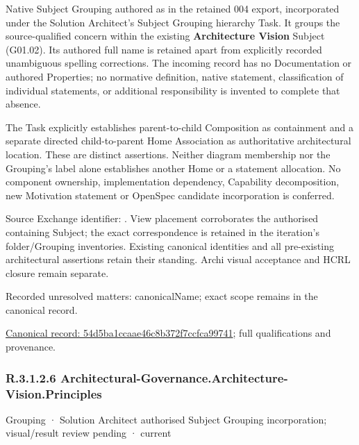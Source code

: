 Native Subject Grouping authored as \texttt{} in the retained 004 export,
incorporated under the Solution Architect's Subject Grouping hierarchy Task.
It groups the source-qualified \texttt{} concern within
the existing \textbf{Architecture Vision} Subject (G01.02). Its authored full name
is retained apart from explicitly recorded unambiguous spelling corrections.
The incoming record has no Documentation or authored Properties; no normative
definition, native statement, classification of individual statements, or
additional responsibility is invented to complete that absence.



The Task explicitly establishes parent-to-child Composition as containment and
a separate directed child-to-parent Home Association as authoritative architectural
location. These are distinct assertions. Neither diagram membership nor the
Grouping's label alone establishes another Home or a statement allocation.
No component ownership, implementation dependency, Capability decomposition,
new Motivation statement or OpenSpec candidate incorporation is conferred.



Source Exchange identifier: \texttt{}. View placement corroborates
the authorised containing Subject; the exact correspondence is retained in the
iteration's folder/Grouping inventories. Existing canonical identities and all
pre-existing architectural assertions retain their standing. Archi visual
acceptance and HCRL closure remain separate.


{\small Recorded unresolved matters: canonicalName; exact scope remains in the canonical record.}\par
{\footnotesize \href{../../../../continuum/grouping/54d5ba1ccaae46c8b372f7ccfca99741.md}{Canonical record: 54d5ba1ccaae46c8b372f7ccfca99741}; full qualifications and provenance.}\par
\subsubsection*{R.3.1.2.6 Architectural-Governance.Architecture-Vision.Principles}
\label{navigation:R.3.1.2.6}

\label{element:87694e76de1d4b93af63a16a9f5de128}
{\small Grouping · Solution Architect authorised Subject Grouping incorporation; visual/result review pending · current}\par

